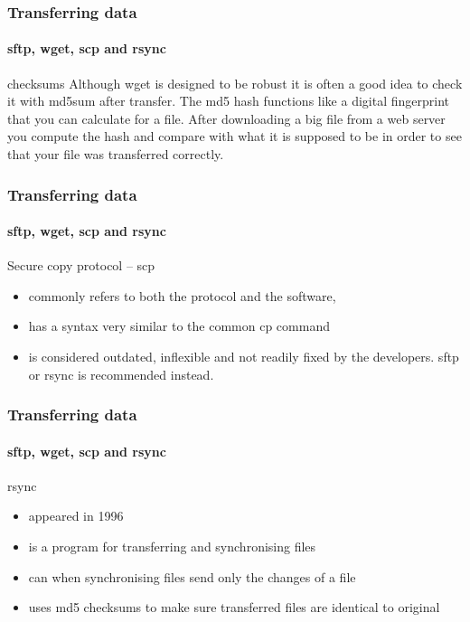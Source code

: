 \documentclass[aspectratio=169,usenames,dvipsnames]{beamer}
\begin{document}
    \begin{frame}
        \frametitle{Transferring data}
        \framesubtitle{sftp, wget, scp and rsync}
        \begin{block}{checksums}
            Although wget is designed to be robust it is often a good idea to
            check it with md5sum after transfer. The md5 hash functions like 
            a digital fingerprint that you can calculate for a file. After
            downloading a big file from a web server you \alert{compute the hash and
            compare with what it is supposed to be} in order to see that your
            file was transferred correctly.
        \end{block}
    \end{frame}
    \begin{frame}
        \frametitle{Transferring data}
        \framesubtitle{sftp, wget, scp and rsync}
        \begin{block}{Secure copy protocol -- scp}
        \begin{itemize}
            \item commonly refers to both the protocol and the software,
            \item has a \alert{syntax very similar to the common cp command}
            \item is considered \alert{outdated, inflexible} and not readily fixed by
            the developers. sftp or rsync is recommended instead.
        \end{itemize}
        \end{block}
    \end{frame}
    \begin{frame}
        \frametitle{Transferring data}
        \framesubtitle{sftp, wget, scp and rsync}
        \begin{block}{rsync}
        \begin{itemize}
            \item appeared in 1996
            \item is a program for \alert{transferring} and \alert{synchronising} files
            \item can when synchronising files \alert{send only the changes} of a file 
            \item \alert{uses md5 checksums} to make sure transferred files are identical to original
        \end{itemize}
        \end{block}
    \end{frame}
\end{document}
